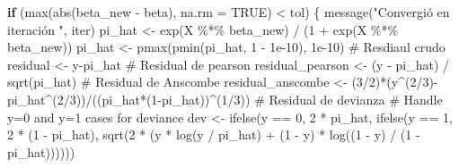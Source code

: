 \documentclass[
  letterpaper,
  DIV=11,
  numbers=noendperiod]{scrartcl}
\newenvironment{Shaded}{\begin{snugshade}}{\end{snugshade}}
\newcommand{\AttributeTok}[1]{\textcolor[rgb]{0.40,0.45,0.13}{#1}}
\newcommand{\CommentTok}[1]{\textcolor[rgb]{0.37,0.37,0.37}{#1}}
\newcommand{\ConstantTok}[1]{\textcolor[rgb]{0.56,0.35,0.01}{#1}}
\newcommand{\ControlFlowTok}[1]{\textcolor[rgb]{0.00,0.23,0.31}{\textbf{#1}}}
\newcommand{\DecValTok}[1]{\textcolor[rgb]{0.68,0.00,0.00}{#1}}
\newcommand{\FloatTok}[1]{\textcolor[rgb]{0.68,0.00,0.00}{#1}}
\newcommand{\FunctionTok}[1]{\textcolor[rgb]{0.28,0.35,0.67}{#1}}
\newcommand{\NormalTok}[1]{\textcolor[rgb]{0.00,0.23,0.31}{#1}}
\newcommand{\OtherTok}[1]{\textcolor[rgb]{0.00,0.23,0.31}{#1}}
\newcommand{\SpecialCharTok}[1]{\textcolor[rgb]{0.37,0.37,0.37}{#1}}
\newcommand{\StringTok}[1]{\textcolor[rgb]{0.13,0.47,0.30}{#1}}
\begin{document}
\begin{Shaded}
\begin{Highlighting}[]
    \ControlFlowTok{if}\NormalTok{ (}\FunctionTok{max}\NormalTok{(}\FunctionTok{abs}\NormalTok{(beta\_new }\SpecialCharTok{{-}}\NormalTok{ beta), }\AttributeTok{na.rm =} \ConstantTok{TRUE}\NormalTok{) }\SpecialCharTok{\textless{}}\NormalTok{ tol) \{}
      \FunctionTok{message}\NormalTok{(}\StringTok{"Convergió en iteración "}\NormalTok{, iter)}
\NormalTok{      pi\_hat }\OtherTok{\textless{}{-}} \FunctionTok{exp}\NormalTok{(X }\SpecialCharTok{\%*\%}\NormalTok{ beta\_new) }\SpecialCharTok{/}\NormalTok{ (}\DecValTok{1} \SpecialCharTok{+} \FunctionTok{exp}\NormalTok{(X }\SpecialCharTok{\%*\%}\NormalTok{ beta\_new))}
\NormalTok{      pi\_hat }\OtherTok{\textless{}{-}} \FunctionTok{pmax}\NormalTok{(}\FunctionTok{pmin}\NormalTok{(pi\_hat, }\DecValTok{1} \SpecialCharTok{{-}} \FloatTok{1e{-}10}\NormalTok{), }\FloatTok{1e{-}10}\NormalTok{) }
      \CommentTok{\# Resdiaul crudo}
\NormalTok{      residual }\OtherTok{\textless{}{-}}\NormalTok{ y}\SpecialCharTok{{-}}\NormalTok{pi\_hat}
      \CommentTok{\# Residual de pearson}
\NormalTok{      residual\_pearson }\OtherTok{\textless{}{-}}\NormalTok{ (y }\SpecialCharTok{{-}}\NormalTok{ pi\_hat) }\SpecialCharTok{/} \FunctionTok{sqrt}\NormalTok{(pi\_hat)}
      \CommentTok{\# Residual de Anscombe}
\NormalTok{      residual\_anscombe }\OtherTok{\textless{}{-}}\NormalTok{ (}\DecValTok{3}\SpecialCharTok{/}\DecValTok{2}\NormalTok{)}\SpecialCharTok{*}\NormalTok{(y}\SpecialCharTok{\^{}}\NormalTok{(}\DecValTok{2}\SpecialCharTok{/}\DecValTok{3}\NormalTok{)}\SpecialCharTok{{-}}\NormalTok{pi\_hat}\SpecialCharTok{\^{}}\NormalTok{(}\DecValTok{2}\SpecialCharTok{/}\DecValTok{3}\NormalTok{))}\SpecialCharTok{/}\NormalTok{((pi\_hat}\SpecialCharTok{*}\NormalTok{(}\DecValTok{1}\SpecialCharTok{{-}}\NormalTok{pi\_hat))}\SpecialCharTok{\^{}}\NormalTok{(}\DecValTok{1}\SpecialCharTok{/}\DecValTok{3}\NormalTok{))}
      \CommentTok{\# Residual de devianza}
      \CommentTok{\# Handle y=0 and y=1 cases for deviance}
\NormalTok{      dev }\OtherTok{\textless{}{-}} \FunctionTok{ifelse}\NormalTok{(y }\SpecialCharTok{==} \DecValTok{0}\NormalTok{, }\DecValTok{2} \SpecialCharTok{*}\NormalTok{ pi\_hat, }\FunctionTok{ifelse}\NormalTok{(y }\SpecialCharTok{==} \DecValTok{1}\NormalTok{, }\DecValTok{2} \SpecialCharTok{*}\NormalTok{ (}\DecValTok{1} \SpecialCharTok{{-}}\NormalTok{ pi\_hat),}
                    \FunctionTok{sqrt}\NormalTok{(}\DecValTok{2} \SpecialCharTok{*}\NormalTok{ (y }\SpecialCharTok{*} \FunctionTok{log}\NormalTok{(y }\SpecialCharTok{/}\NormalTok{ pi\_hat) }\SpecialCharTok{+}\NormalTok{ (}\DecValTok{1} \SpecialCharTok{{-}}\NormalTok{ y) }\SpecialCharTok{*} \FunctionTok{log}\NormalTok{((}\DecValTok{1} \SpecialCharTok{{-}}\NormalTok{ y) }\SpecialCharTok{/}\NormalTok{ (}\DecValTok{1} \SpecialCharTok{{-}}\NormalTok{ pi\_hat))))))}

\end{Highlighting}
\end{Shaded}
\end{document}

